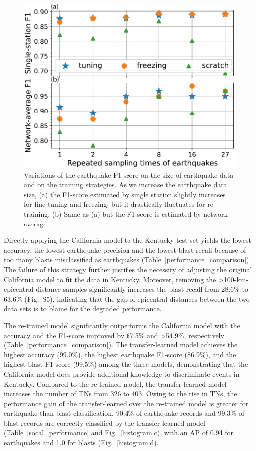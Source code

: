 \documentclass{gji}
\begin{document}
\begin{figure}
\centering
\includegraphics[width=.45\textwidth]{repeat_times.pdf}
\caption{Variations of the earthquake F1-score on the size of earthquake data and on the training strategies. As we increase the earthquake data size, (a) the F1-score estimated by single station slightly increases for fine-tuning and freezing; but it drastically fluctuates for re-training. (b) Same as (a) but the F1-score is estimated by network average.}
\label{repeated_times}
\end{figure}

Directly applying the California model to the Kentucky test set yields the lowest accuracy, the lowest earthquake precision and the lowest blast recall because of too many blasts misclassified as earthquakes (Table~\ref{performance_comparison}). The failure of this strategy further justifies the necessity of adjusting the original California model to fit the data in Kentucky. Moreover, removing the \textgreater{100}-km-epicentral-distance samples significantly increases the blast recall from 28.6\% to 63.6\% (Fig.~S5), indicating that the gap of epicentral distances between the two data sets is to blame for the degraded performance.

The re-trained model significantly outperforms the California model with the accuracy and the F1-score improved by 67.5\% and \textgreater{54.9}\%, respectively (Table~\ref{performance_comparison}). The transfer-learned model achieves the highest accuracy (99.0\%), the highest earthquake F1-score (86.9\%), and the highest blast F1-score (99.5\%) among the three models, demonstrating that the California model does provide additional knowledge to discriminate events in Kentucky. Compared to the re-trained model, the transfer-learned model increases the number of TNs from 326 to 403. Owing to the rise in TNs, the performance gain of the transfer-learned over the re-trained model is greater for earthquake than blast classification. 90.4\% of earthquake records and 99.3\% of blast records are correctly classified by the transfer-learned model (Table~\ref{socal_performance} and Fig.~\ref{histogram}c), with an AP of 0.94 for earthquakes and 1.0 for blasts (Fig.~\ref{histogram}d).
\end{document}

